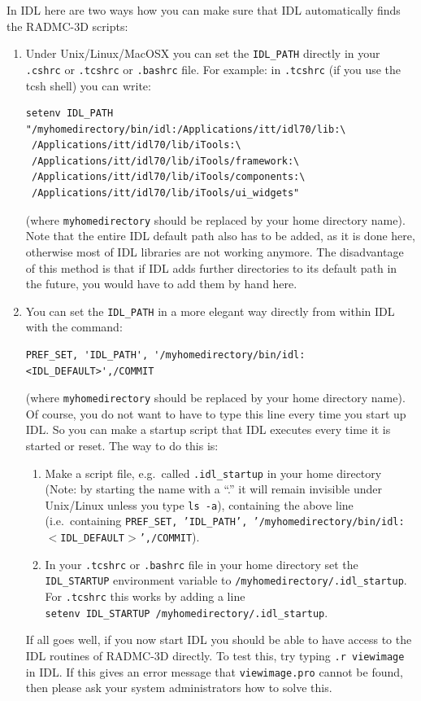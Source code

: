 \documentclass{report}
\begin{document}
In IDL here are two ways how you can make sure that IDL automatically
finds the RADMC-3D scripts:
\begin{enumerate}
\item Under Unix/Linux/MacOSX you can set the {\small\tt IDL\_PATH} directly in your
  {\small\tt .cshrc} or {\small\tt .tcshrc} or {\small\tt .bashrc} file. For example: in
  {\small\tt .tcshrc} (if you use the tcsh shell) you can write:
{\small\begin{verbatim}
setenv IDL_PATH "/myhomedirectory/bin/idl:/Applications/itt/idl70/lib:\
 /Applications/itt/idl70/lib/iTools:\
 /Applications/itt/idl70/lib/iTools/framework:\
 /Applications/itt/idl70/lib/iTools/components:\
 /Applications/itt/idl70/lib/iTools/ui_widgets"
\end{verbatim}}
(where {\small\tt myhomedirectory} should be replaced by your home directory name). 
Note that the entire IDL default path also has to be added, as it is
done here, otherwise most of IDL libraries are not working anymore. The
disadvantage of this method is that if IDL adds further directories to
its default path in the future, you would have to add them by hand here.
\item You can set the {\small\tt IDL\_PATH} in a more elegant way directly from within
IDL with the command:
{\small\begin{verbatim}
PREF_SET, 'IDL_PATH', '/myhomedirectory/bin/idl:<IDL_DEFAULT>',/COMMIT
\end{verbatim}}
(where {\small\tt myhomedirectory} should be replaced by your home directory name).  Of
course, you do not want to have to type this line every time you start up
IDL. So you can make a startup script that IDL executes every time it is
started or reset. The way to do this is:
\begin{enumerate}
\item Make a script file, e.g.\ called {\small\tt .idl\_startup} in your home
  directory (Note: by starting the name with a ``.'' it will remain
  invisible under Unix/Linux unless you type {\small\tt ls -a}), containing the
  above line (i.e.\ containing {\small\tt PREF\_SET, 'IDL\_PATH',
    '/myhomedirectory/bin/idl:$<$IDL\_DEFAULT$>$',/COMMIT}).
\item In your {\small\tt .tcshrc} or {\small\tt .bashrc} file in your
  home directory set the 
{\small\tt IDL\_STARTUP}
  environment variable to {\small\tt /myhomedirectory/.idl\_startup}. For
  {\small\tt .tcshrc} this works by adding a line\\ {\small\tt setenv IDL\_STARTUP 
  /myhomedirectory/.idl\_startup}. 
\end{enumerate}
If all goes well, if you now start IDL you should be able to have access to
the IDL routines of RADMC-3D directly. To test this, try typing {\small\tt .r
  viewimage} in IDL. If this gives an error message that {\small\tt viewimage.pro}
cannot be found, then please ask your system administrators how to solve this.
\end{enumerate}
\end{document}
